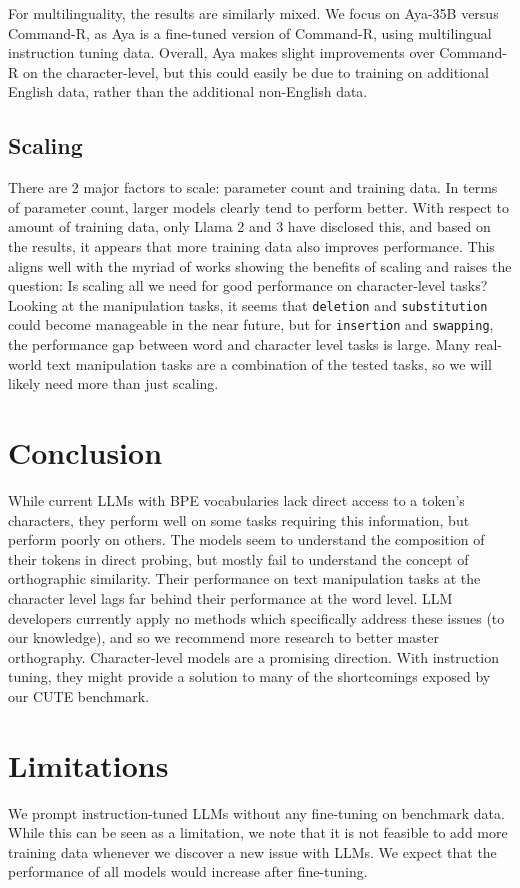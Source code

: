 For multilinguality, the results are similarly mixed. We focus on Aya-35B versus Command-R, as Aya is a fine-tuned version of Command-R, using multilingual instruction tuning data. Overall, Aya makes slight improvements over Command-R on the character-level, but this could easily be due to training on additional English data, rather than the additional non-English data.

\subsection{Scaling}
There are 2 major factors to scale: parameter count and training data. In terms of parameter count, larger models clearly tend to perform better. With respect to amount of training data, only Llama 2 and 3 have disclosed this, and based on the results, it appears that more training data also improves performance. This aligns well with the myriad of works showing the benefits of scaling and raises the question: Is scaling all we need for good performance on character-level tasks? Looking at the manipulation tasks, it seems that \texttt{deletion} and \texttt{substitution} could become manageable in the near future, but for \texttt{insertion} and \texttt{swapping}, the performance gap between word and character level tasks is large. Many real-world text manipulation tasks are a combination of the tested tasks, so we will likely need more than just scaling. 

\section{Conclusion}
While current LLMs with BPE vocabularies lack direct access to a token's characters, they perform well on some tasks requiring this information, but perform poorly on others. The models seem to understand the composition of their tokens in direct probing, but mostly fail to understand the concept of orthographic similarity. Their performance on text manipulation tasks at the character level lags far behind their performance at the word level. LLM developers currently apply no methods which specifically address these issues (to our knowledge), and so we recommend more research to better master orthography. Character-level models are a promising direction. With instruction tuning, they might provide a solution to many of the shortcomings exposed by our CUTE benchmark.

\section{Limitations}
We prompt instruction-tuned LLMs without any fine-tuning on benchmark data. While this can be seen as a limitation, we note that it is not feasible to add more training data whenever we discover a new issue with LLMs. We expect that the performance of all models would increase after fine-tuning.

